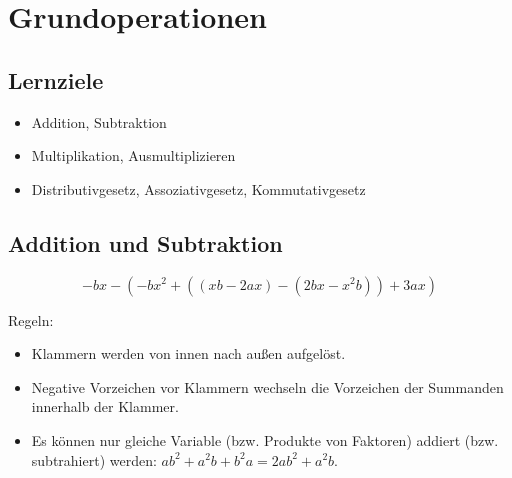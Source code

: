 \newpage
\section{Grundoperationen}
\renewcommand{\bbwAufgabenBlockID}{A1G}

\subsection*{Lernziele}
\begin{itemize}
\item Addition, Subtraktion
\item Multiplikation, Ausmultiplizieren
\item Distributivgesetz,
  Assoziativgesetz,
  Kommutativgesetz
\end{itemize}

\newpage

\subsection{Addition und Subtraktion}
\begin{beispiel}{}{}
$$-bx-(-bx^2+((xb-2ax)-(2bx-x^2b))+3ax)$$
\end{beispiel}


Regeln:
\begin{itemize}
\item Klammern werden von innen nach außen aufgelöst.
\item Negative Vorzeichen vor Klammern wechseln die Vorzeichen der
      Summanden innerhalb der Klammer.
\item Es können nur gleiche Variable (bzw. Produkte von Faktoren)
      addiert (bzw. subtrahiert) werden: $ab^2 + a^2b + b^2a = 2ab^2+a^2b$.
\end{itemize}


